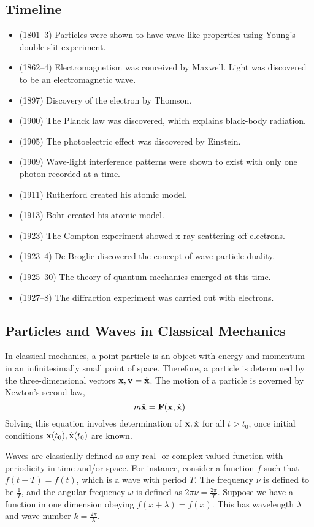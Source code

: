 \subsection{Timeline}
\begin{itemize}
	\item (1801--3) Particles were shown to have wave-like properties using Young's double slit experiment.
	\item (1862--4) Electromagnetism was conceived by Maxwell.
	      Light was discovered to be an electromagnetic wave.
	\item (1897) Discovery of the electron by Thomson.
	\item (1900) The Planck law was discovered, which explains black-body radiation.
	\item (1905) The photoelectric effect was discovered by Einstein.
	\item (1909) Wave-light interference patterns were shown to exist with only one photon recorded at a time.
	\item (1911) Rutherford created his atomic model.
	\item (1913) Bohr created his atomic model.
	\item (1923) The Compton experiment showed x-ray scattering off electrons.
	\item (1923--4) De Broglie discovered the concept of wave-particle duality.
	\item (1925--30) The theory of quantum mechanics emerged at this time.
	\item (1927--8) The diffraction experiment was carried out with electrons.
\end{itemize}

\subsection{Particles and Waves in Classical Mechanics}
In classical mechanics, a point-particle is an object with energy and momentum in an infinitesimally small point of space.
Therefore, a particle is determined by the three-dimensional vectors \( \vb x, \vb v = \dot{\vb x} \).
The motion of a particle is governed by Newton's second law,
\[
	m \ddot{\vb x} = \vb F(\vb x, \dot{\vb x})
\]
Solving this equation involves determination of \( \vb x, \dot{\vb x} \) for all \( t > t_0 \), once initial conditions \( \vb x(t_0), \dot{\vb x}(t_0) \) are known.

Waves are classically defined as any real- or complex-valued function with periodicity in time and/or space.
For instance, consider a function \( f \) such that \( f(t + T) = f(t) \), which is a wave with period \( T \).
The frequency \( \nu \) is defined to be \( \frac{1}{T} \), and the angular frequency \( \omega \) is defined as \( 2 \pi \nu = \frac{2\pi}{T} \).
Suppose we have a function in one dimension obeying \( f(x+\lambda) = f(x) \).
This has wavelength \( \lambda \) and wave number \( k = \frac{2\pi}{\lambda} \).

